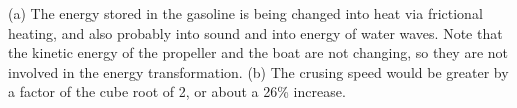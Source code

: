 (a) The energy stored in the gasoline is being changed
into heat via frictional heating, and also probably into
sound and into energy of water waves. Note that the kinetic
energy of the propeller and the boat are not changing, so
they are not involved in the energy transformation. (b) The
crusing speed would be greater by a factor of the cube root
of 2, or about a 26\% increase.



